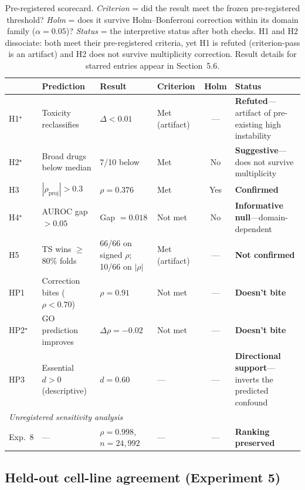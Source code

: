 \documentclass[11pt]{article}
\begin{document}
\begin{table}[t]
\centering
\caption{Pre-registered scorecard.
\emph{Criterion} = did the result meet the frozen pre-registered
threshold?
\emph{Holm} = does it survive Holm--Bonferroni correction within its
domain family ($\alpha = 0.05$)?
\emph{Status} = the interpretive status after both checks.
H1 and H2 dissociate: both meet their pre-registered criteria, yet H1
is refuted (criterion-pass is an artifact) and H2 does not survive
multiplicity correction.
Result details for starred entries appear in Section~5.6.}
\label{tab:scorecard}
\small
\begin{tabular}{@{}lp{2.7cm}p{3.0cm}p{1.7cm}cp{3.3cm}@{}}
\toprule
 & Prediction & Result & Criterion & Holm & Status \\
\midrule
H1$^\star$ & Toxicity reclassifies & $\Delta < 0.01$ & Met (artifact) & --- & \textbf{Refuted}---artifact of pre-existing high instability \\
H2$^\star$ & Broad drugs below median & 7/10 below & Met & No & \textbf{Suggestive}---does not survive multiplicity \\
H3 & $|\rho_{\text{proj}}| > 0.3$ & $\rho = 0.376$ & Met & Yes & \textbf{Confirmed} \\
H4$^\star$ & AUROC gap $> 0.05$ & Gap $= 0.018$ & Not met & No & \textbf{Informative null}---domain-dependent \\
H5 & TS wins $\geq$80\% folds & 66/66 on signed $\rho$; 10/66 on $|\rho|$ & Met (artifact) & --- & \textbf{Not confirmed} \\
\midrule
HP1 & Correction bites ($\rho < 0.70$) & $\rho = 0.91$ & Not met & --- & \textbf{Doesn't bite} \\
HP2$^\star$ & GO prediction improves & $\Delta\rho = -0.02$ & Not met & --- & \textbf{Doesn't bite} \\
HP3 & Essential $d > 0$ (descriptive) & $d = 0.60$ & --- & --- & \textbf{Directional support}---inverts the predicted confound \\
\midrule
\multicolumn{6}{l}{\emph{Unregistered sensitivity analysis}}\\
Exp.~8 & --- & $\rho = 0.998$, $n = 24{,}992$ & --- & --- & \textbf{Ranking preserved} \\
\bottomrule
\end{tabular}
\end{table}

\subsection{Held-out cell-line agreement (Experiment 5)}
\label{sec:exp5}
\end{document}
